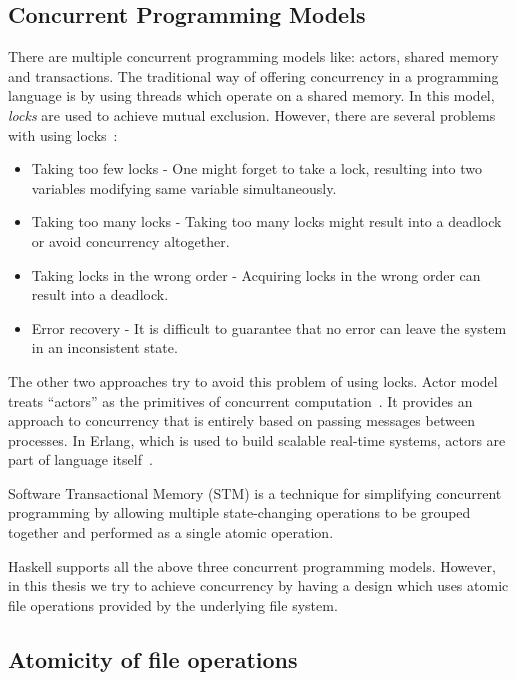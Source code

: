 \subsection{Concurrent Programming Models}

There are multiple concurrent programming models like: actors, shared memory and transactions. The traditional way of offering concurrency in a programming language is by using threads which operate on a shared memory. In this model, \textit{locks} are used to achieve mutual exclusion. However, there are several problems with using locks~\cite{jones2007beautiful}:

\begin{itemize}
  \item Taking too few locks - One might forget to take a lock, resulting into two variables modifying same variable simultaneously.
  \item Taking too many locks - Taking too many locks might result into a deadlock or avoid concurrency altogether.
  \item Taking locks in the wrong order - Acquiring locks in the wrong order can result into a deadlock.
  \item Error recovery - It is difficult to guarantee that no error can leave the system in an inconsistent state.
\end{itemize}

The other two approaches try to avoid this problem of using locks. Actor model treats ``actors'' as the primitives of concurrent computation~\cite{hewitt1973universal}. It provides an approach to concurrency that is entirely based on passing messages between processes. In Erlang, which is used to build scalable real-time systems, actors are part of language itself~\cite{armstrong1993concurrent}.

Software Transactional Memory (STM) is a technique for simplifying concurrent programming by allowing multiple state-changing operations to be grouped together and performed as a single atomic operation.

Haskell supports all the above three concurrent programming models. However, in this thesis we try to achieve concurrency by having a design which uses atomic file operations provided by the underlying file system.

\subsection{Atomicity of file operations}

